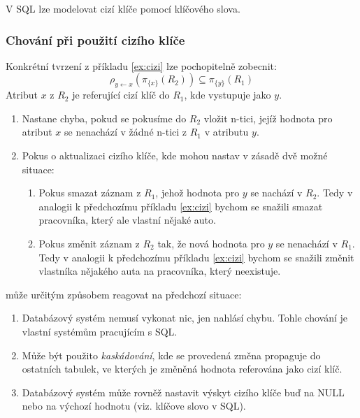 V SQL lze modelovat cizí klíče pomocí klíčového slova.

\subsubsection{Chování při použití cizího klíče}
Konkrétní tvrzení z příkladu \ref{ex:cizi} lze pochopitelně zobecnit:
$$
\rho_{y \leftarrow x}(\pi_{\{x\}} \left( R_{2} \right) ) \subseteq \pi_{\{y\}} \left( R_{1} \right)
$$
Atribut $x$ z $R_{2}$ je referující cizí klíč do $R_{1}$, kde vystupuje jako $y$.
\begin{enumerate}
\item Nastane chyba, pokud se pokusíme do $R_{2}$ vložit n-tici, jejíž hodnota pro atribut $x$  se nenachází v žádné n-tici z $R_{1}$ v atributu $y$.
\item Pokus o aktualizaci cizího klíče, kde mohou nastav v zásadě dvě možné situace:
\begin{enumerate}
\item Pokus smazat záznam z $R_{1}$, jehož hodnota pro $y$ se nachází v $R_{2}$. Tedy v analogii k předchozímu příkladu \ref{ex:cizi} bychom se snažili smazat pracovníka, který ale vlastní nějaké auto.
\item Pokus změnit záznam z $R_{2}$ tak, že nová hodnota pro $y$ se nenachází v $R_{1}$. Tedy v analogii k předchozímu příkladu \ref{ex:cizi} bychom se snažili změnit vlastníka nějakého auta na pracovníka, který neexistuje.
\end{enumerate}
\end{enumerate}

 může určitým způsobem reagovat na předchozí situace:
\begin{enumerate}
\item Databázový systém nemusí vykonat nic, jen nahlásí chybu. Tohle chování je vlastní systémům pracujícím s SQL.
\item Může být použito \textit{kaskádování}, kde se provedená změna propaguje do ostatních tabulek, ve kterých je změněná hodnota referována jako cizí klíč.
\item Databázový systém může rovněž nastavit výskyt cizího klíče buď na NULL nebo na výchozí hodnotu (viz. klíčove slovo v SQL).
\end{enumerate}


